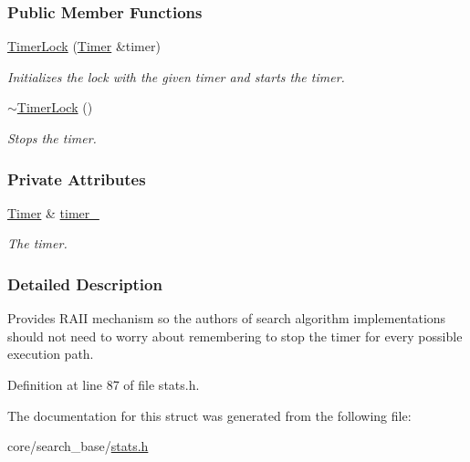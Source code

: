 \subsubsection*{Public Member Functions}
\begin{DoxyCompactItemize}
\item 
\hyperlink{structslb_1_1core_1_1sb_1_1TimerLock_a0f262ba9f9f04da2cb5c819560bac090}{Timer\+Lock} (\hyperlink{structslb_1_1core_1_1sb_1_1Timer}{Timer} \&timer)\hypertarget{structslb_1_1core_1_1sb_1_1TimerLock_a0f262ba9f9f04da2cb5c819560bac090}{}\label{structslb_1_1core_1_1sb_1_1TimerLock_a0f262ba9f9f04da2cb5c819560bac090}

\begin{DoxyCompactList}\small\item\em Initializes the lock with the given timer and starts the timer. \end{DoxyCompactList}\item 
\hyperlink{structslb_1_1core_1_1sb_1_1TimerLock_a0f8a21625685fb1a98cd497c4570ed5b}{$\sim$\+Timer\+Lock} ()\hypertarget{structslb_1_1core_1_1sb_1_1TimerLock_a0f8a21625685fb1a98cd497c4570ed5b}{}\label{structslb_1_1core_1_1sb_1_1TimerLock_a0f8a21625685fb1a98cd497c4570ed5b}

\begin{DoxyCompactList}\small\item\em Stops the timer. \end{DoxyCompactList}\end{DoxyCompactItemize}
\subsubsection*{Private Attributes}
\begin{DoxyCompactItemize}
\item 
\hyperlink{structslb_1_1core_1_1sb_1_1Timer}{Timer} \& \hyperlink{structslb_1_1core_1_1sb_1_1TimerLock_aaa7b4029e8ee4d3ef571cdfc6384ad09}{timer\+\_\+}\hypertarget{structslb_1_1core_1_1sb_1_1TimerLock_aaa7b4029e8ee4d3ef571cdfc6384ad09}{}\label{structslb_1_1core_1_1sb_1_1TimerLock_aaa7b4029e8ee4d3ef571cdfc6384ad09}

\begin{DoxyCompactList}\small\item\em The timer. \end{DoxyCompactList}\end{DoxyCompactItemize}


\subsubsection{Detailed Description}
Provides R\+A\+II mechanism so the authors of search algorithm implementations should not need to worry about remembering to stop the timer for every possible execution path. 

Definition at line 87 of file stats.\+h.



The documentation for this struct was generated from the following file\+:\begin{DoxyCompactItemize}
\item 
core/search\+\_\+base/\hyperlink{stats_8h}{stats.\+h}\end{DoxyCompactItemize}
